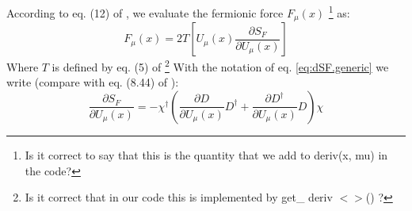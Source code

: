 \documentclass[12pt, a4paper]{article}
\begin{document}
According to eq. (12) of \cite{BITAR1989377}, we evaluate the fermionic force $F_{\mu}(x)$ 
\footnote{
Is it correct to say that this is the quantity that we add to deriv(x, mu) in the code?
}
as:
%
\begin{equation}
F_{\mu}(x) = 
2 T
\left[ 
U_{\mu}(x) \frac{\partial S_F}{\partial U_{\mu}(x)} 
\right]
\end{equation}
%
Where $T$ is defined by eq. (5) of \cite{BITAR1989377}
\footnote{Is it correct that in our code this is implemented by get\_ deriv $<>$() ?}
%
With the notation of eq. \eqref{eq:dSF.generic} we write 
(compare with eq. (8.44) of \cite{gattringer2009quantum}):
%
\begin{equation}
\frac{\partial S_F}{\partial U_{\mu}(x)}
= 
- \chi^{\dagger}
\left( 
\frac{\partial D}{\partial U_{\mu}(x)} D^{\dagger}
+
\frac{\partial D^{\dagger}}{\partial U_{\mu}(x)} D
\right) 
\chi
\end{equation}
\end{document}
